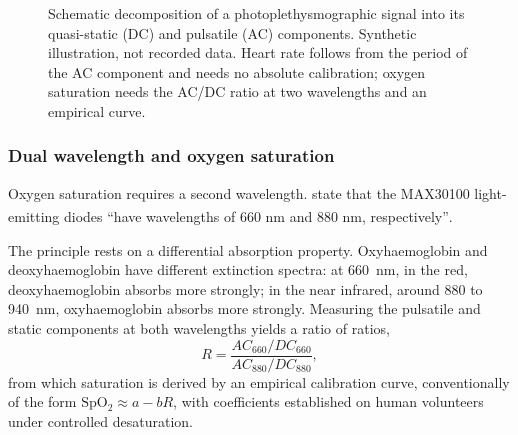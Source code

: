 \documentclass[12pt,a4paper,oneside]{report}
\newcommand{\bq}[1]{``#1''\textsuperscript{\dag}}
\begin{document}
\begin{figure}[htbp]
\centering
{}
\caption{Schematic decomposition of a photoplethysmographic signal into its quasi-static (DC) and pulsatile (AC) components. Synthetic illustration, not recorded data. Heart rate follows from the period of the AC component and needs no absolute calibration; oxygen saturation needs the AC/DC ratio at two wavelengths and an empirical curve.}\label{fig:ppg}
\end{figure}

\subsubsection{Dual wavelength and oxygen saturation}

Oxygen saturation requires a second wavelength. \Textcite{efendi2025} state that the MAX30100 light-emitting diodes \bq{have wavelengths of 660 nm and 880 nm, respectively}.

The principle rests on a differential absorption property. Oxyhaemoglobin and deoxyhaemoglobin have different extinction spectra: at 660~nm, in the red, deoxyhaemoglobin absorbs more strongly; in the near infrared, around 880 to 940~nm, oxyhaemoglobin absorbs more strongly. Measuring the pulsatile and static components at both wavelengths yields a ratio of ratios,
\begin{equation}
  R = \frac{AC_{660}/DC_{660}}{AC_{880}/DC_{880}},
\end{equation}
from which saturation is derived by an empirical calibration curve, conventionally of the form $\mathrm{SpO_2} \approx a - bR$, with coefficients established on human volunteers under controlled desaturation.
\end{document}
